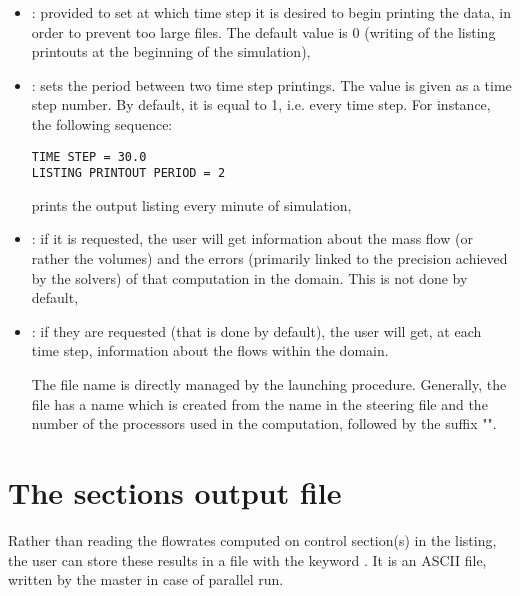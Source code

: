 \begin{itemize}

\item {}: provided to set at
which time step it is desired to begin printing the data, in order to prevent
too large files.
The default value is 0 (writing of the listing printouts at the
beginning of the simulation),

\item {}: sets the period between two time step
printings. The value is given as a time step number.
By default, it is equal to 1, i.e. every time step.
For instance, the following sequence:

\begin{lstlisting}[language=TelemacCas]
TIME STEP = 30.0
LISTING PRINTOUT PERIOD = 2
\end{lstlisting}

prints the output listing every minute of simulation,

\item {}: if it is requested, the user will get
information about the mass flow (or rather the volumes) and the errors
(primarily linked to the precision achieved by the solvers) of that computation
in the domain. This is not done by default,

\item {}: if they are
requested (that is done by default), the user will get, at each time step,
information about the flows within the domain.

The file name is directly managed by the  launching procedure.
Generally, the file has a name which is created from the name in the steering
file and the number of the processors used in the computation, followed by the
suffix "".

\end{itemize}

\section{The sections output file}

Rather than reading the flowrates computed on control section(s) in the listing,
the user can store these results in a file with the keyword
.
It is an ASCII file, written by the master in case of parallel run.

